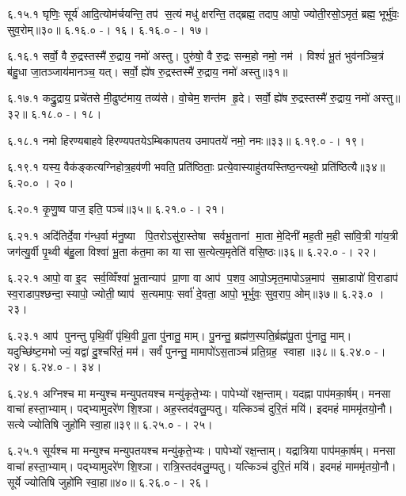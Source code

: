 ६.१५.१
घृणिः॒ सूर्य॑ आदि॒त्योम॑र्चयन्ति॒ तप॑ स॒त्यं मधु॑ क्षरन्ति॒ तद्ब्रह्म॒ तदाप॒ आपो॒ ज्योती॒रसो॒ऽमृतं॒ ब्रह्म॒ भूर्भु॑वः॒ सुव॒रोम्॥३०॥
६.१६.०
-। १६।
६.१६.०
-। १७।
\anuvakamend

६.१६.१
सर्वो॒ वै रु॒द्रस्तस्मै॑ रु॒द्राय॒ नमो॑ अस्तु। पुरु॑षो॒ वै रु॒द्रः सन्म॒हो नमो॒ नम॑। विश्वं॑ भू॒तं भुव॑नञ्चि॒त्रं ब॑हु॒धा जा॒तञ्जाय॑मानञ्च॒ यत्। सर्वो॒ ह्ये॑ष रु॒द्रस्तस्मै॑ रु॒द्राय॒ नमो॑ अस्तु॥३१॥
\anuvakamend

६.१७.१
कद्रु॒द्राय॒ प्रचे॑तसे मी॒ढुष्ट॑माय॒ तव्य॑से। वो॒चेम॒ शन्त॑म हृ॒दे। सर्वो॒ ह्ये॑ष रु॒द्रस्तस्मै॑ रु॒द्राय॒ नमो॑ अस्तु॥३२॥
६.१८.०
-। १८।
\anuvakamend

६.१८.१
नमो हिरण्यबाहवे हिरण्यपतयेऽम्बिकापतय उमापतये॑ नमो॒ नमः॥३३॥
६.१९.०
-। १९।
\anuvakamend

६.१९.१
यस्य॒ वैक॑ङ्कत्यग्निहोत्र॒हव॑णी भवति॒ प्रति॑ष्ठिताः॒ प्रत्ये॒वास्याहु॑तयस्तिष्ठ॒न्त्यथो॒ प्रति॑ष्ठित्यै॥३४॥
६.२०.०
। २०।
\anuvakamend

६.२०.१
कृ॒णु॒ष्व पाज॒ इति॒ पञ्च॑॥३५॥
६.२१.०
-। २१।
\anuvakamend

६.२१.१
अदि॑तिर्दे॒वा ग॑न्ध॒र्वा म॑नु॒ष्या पि॒तरोऽसु॑रा॒स्तेषा सर्वभू॒तानां मा॒ता मे॒दिनी॑ मह॒ती म॒ही सा॑वि॒त्री गा॑य॒त्री जग॑त्यु॒र्वी पृ॒थ्वी ब॑हु॒ला विश्वा॑ भू॒ता क॑त॒मा का या सा स॒त्येत्य॒मृतेति॑ वसि॒ष्ठः॥३६॥
६.२२.०
-। २२।
\anuvakamend

६.२२.१
आपो॒ वा इ॒द सर्व॒व्विँश्वा॑ भू॒तान्याप॑ प्रा॒णा वा आप॑ प॒शव॒ आपो॒ऽमृत॒मापोऽन्न॒माप॑ स॒म्राडापो॑ वि॒राडाप॑ स्व॒राडाप॒श्छन्दा॒स्यापो॒ ज्योती॒ष्याप॑ स॒त्यमापः॒ सर्वा॑ दे॒वता॒ आपो॒ भूर्भुवः॒ सुव॒राप॒ ओम्॥३७॥
६.२३.०
। २३।
\anuvakamend

६.२३.१
आप॑ पुनन्तु पृथि॒वीं पृ॑थि॒वी पू॒ता पु॑नातु॒ माम्। पु॒नन्तु॒ ब्रह्म॑ण॒स्पति॒र्ब्रह्म॑पू॒ता पु॑नातु॒ माम्। यदुच्छि॑ष्ट॒मभोज्यं॒ यद्वा॑ दु॒श्चरि॑तं॒ मम॑। सर्वं॑ पुनन्तु॒ मामापो॑ऽस॒ताञ्च॑ प्रति॒ग्रह॒ स्वाहा॥३८॥
६.२४.०
-। २४।
६.२४.०
-। ३४।
\anuvakamend

६.२४.१
अग्निश्च मा मन्युश्च मन्युपतयश्च मन्यु॑कृते॒भ्यः। पापेभ्यो॑ रक्ष॒न्ताम्। यदह्ना पाप॑मका॒र्\mbox{}षम्। मनसा वाचा॑ हस्ता॒भ्याम्। पद्भ्यामुदरे॑ण शि॒श्ञा। अह॒स्तद॑वलु॒म्पतु। यत्किञ्च॑ दुरि॒तं मयि॑। इदमहं माममृ॑तयो॒नौ। सत्ये ज्योतिषि जुहो॑मि स्वा॒हा॥३९॥
६.२५.०
-। २५।
\anuvakamend

६.२५.१
सूर्यश्च मा मन्युश्च मन्युपतयश्च मन्यु॑कृते॒भ्यः। पापेभ्यो॑ रक्ष॒न्ताम्। यद्रात्रिया पाप॑मका॒र्\mbox{}षम्। मनसा वाचा॑ हस्ता॒भ्याम्। पद्भ्यामुदरे॑ण शि॒श्ञा। रात्रि॒स्तद॑वलु॒म्पतु। यत्किञ्च॑ दुरि॒तं मयि॑। इदमहं माममृ॑तयो॒नौ। सूर्ये ज्योतिषि जुहो॑मि स्वा॒हा॥४०॥
६.२६.०
-। २६।
\anuvakamend


